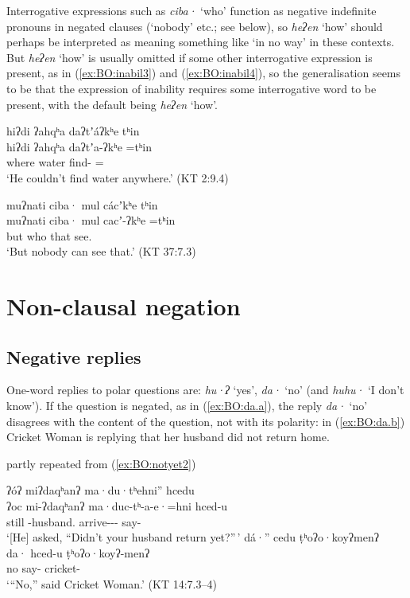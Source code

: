 \documentclass[output=paper,modfonts,nonflat,colorlinks,citecolor=brown]{langscibook}
\begin{document}
Interrogative expressions such as \textit{ciba·} `who' function as negative indefinite pronouns in negated clauses (`nobody' etc.; see  below), so \textit{heʔen} `how' should perhaps be interpreted as meaning something like `in no way' in these contexts. But \textit{heʔen} `how' is usually omitted if some other interrogative expression is present, as in (\ref{ex:BO:inabil3}) and (\ref{ex:BO:inabil4}), so the generalisation seems to be that the expression of inability requires some interrogative word to be present, with the default being \textit{heʔen} `how'.

\ea 
\label{ex:BO:inabil3}
\glll hiʔdi ʔahqʰa daʔtʼáʔkʰe tʰin\\
    hiʔdi ʔahqʰa daʔtʼa-ʔkʰe =tʰin\\
    where water find- =\\
\glt `He couldn’t find water anywhere.' ({KT 2:9.4})\\
\z

\ea 
\label{ex:BO:inabil4}
\glll muʔnati ciba· mul cácʼkʰe tʰin\\
    muʔnati ciba· mul cacʼ-ʔkʰe =tʰin\\
    but who that see. \\
\glt `But nobody can see that.' ({KT 37:7.3})\\
\z


\section{Non-clausal negation}

\subsection{Negative replies}
\label{sec:BO:replies}


One-word replies to polar questions are: \textit{hu·ʔ} `yes', \textit{da·} `no' (and \textit{huhu·} `I don't know'). If the question is negated, as in (\ref{ex:BO:da.a}), the reply \textit{da·} `no' disagrees with the content of the question, not with its polarity: in (\ref{ex:BO:da.b}) Cricket Woman is replying that her husband did not return home.


{%
\ea 
\label{ex:BO:da}
partly repeated from (\ref{ex:BO:notyet2})
    \begin{xlist}
    \ex\label{ex:BO:da.a}
        \glll {}ʔóʔ miʔdaqʰanʔ ma·du·tʰehni'' hcedu\\
            ʔoc mi-ʔdaqʰanʔ ma·duc-tʰ-a-e·=hni hced-u\\
            still -husband. arrive--- say-\\
        \glt `[He] asked, “Didn’t your husband return yet?''\,'
    \ex\label{ex:BO:da.b}
        \glll {}dá·'' cedu ṭʰoʔo·koyʔmenʔ\\
             da· hced-u ṭʰoʔo·koyʔ-menʔ\\
             no say- cricket-\\
        \glt `“No,” said Cricket Woman.' ({KT 14:7.3--4})\\
    \end{xlist}
\z
}%
\end{document}
